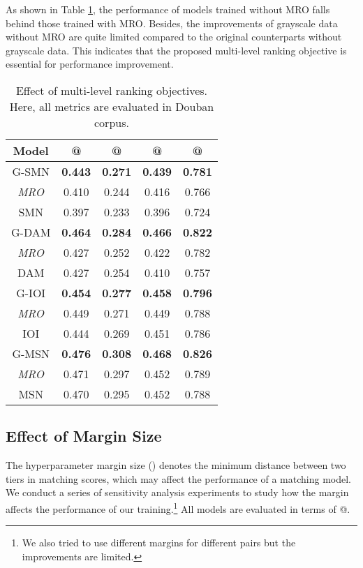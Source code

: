 \documentclass[11pt,a4paper]{article}
\begin{document}
	As shown in Table \ref{multi_leval_table}, the performance of models trained without MRO falls behind those trained with MRO. Besides, the improvements of grayscale data without MRO are quite limited compared to the original counterparts without grayscale data. This indicates that the proposed multi-level ranking objective is essential for performance improvement.
\begin{table}[t]
		\small
		\begin{center}
\begin{tabular}{c||cccc} \textbf{Model} & @ & @ & @ & @ \\
				\hline
				\hline
				G-SMN  & \textbf{0.443} & \textbf{0.271} & \textbf{0.439} & \textbf{0.781} \\
				\textit{MRO} & 0.410 & 0.244 & 0.416 & 0.766 \\
				\hdashline
				SMN & 0.397 & 0.233 & 0.396 & 0.724 \\
				\hline
G-DAM   & \textbf{0.464} & \textbf{0.284} & \textbf{0.466} & \textbf{0.822} \\
				\textit{MRO} & 0.427 & 0.252 & 0.422 & 0.782 \\
				\hdashline
				DAM & 0.427 & 0.254 & 0.410 & 0.757 \\
				\hline
				G-IOI & \textbf{0.454} & \textbf{0.277} & \textbf{0.458} & \textbf{0.796} \\
				\textit{MRO} & 0.449 & 0.271 & 0.449 & 0.788 \\
				\hdashline
				IOI & 0.444 & 0.269 & 0.451 & 0.786 \\
				\hline
				G-MSN  & \textbf{0.476} & \textbf{0.308} & \textbf{0.468} & \textbf{0.826} \\
				\textit{MRO} & 0.471 & 0.297 & 0.452 & 0.789 \\
				\hdashline
				MSN  & 0.470 & 0.295 & 0.452 & 0.788 \\
\end{tabular}
\end{center}
		\caption{\label{multi_leval_table} Effect of multi-level ranking objectives. Here, all metrics are evaluated in Douban corpus.}
	\end{table}
	\subsection{Effect of Margin Size}
	The hyperparameter margin size () denotes the minimum distance between two tiers in matching scores, which may affect the performance of a matching model. We conduct a series of sensitivity analysis experiments to study how the margin affects the performance of our training.\footnote{We also tried to use different margins for different pairs but the improvements are limited.} All models are evaluated in terms of @.
	
\end{document}
